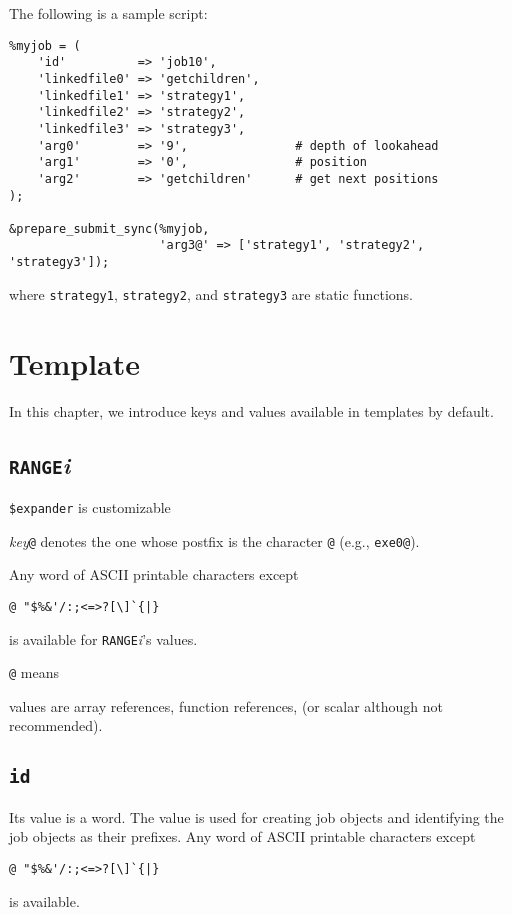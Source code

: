 \documentclass[a4paper,10pt]{report}
\begin{document}
The following is a sample script:
\begin{boxnote}
\begin{verbatim}
%myjob = (
    'id'          => 'job10',
    'linkedfile0' => 'getchildren',
    'linkedfile1' => 'strategy1',
    'linkedfile2' => 'strategy2',
    'linkedfile3' => 'strategy3',
    'arg0'        => '9',               # depth of lookahead
    'arg1'        => '0',               # position
    'arg2'        => 'getchildren'      # get next positions
);

&prepare_submit_sync(%myjob,
                     'arg3@' => ['strategy1', 'strategy2', 'strategy3']);
\end{verbatim}
\end{boxnote}
\noindent
where \texttt{strategy1}, \texttt{strategy2}, and
\texttt{strategy3} are static functions.

\chapter{Template}\label{chapjobdefhash}

In this chapter, we introduce keys and values available in templates
by default.

\section{\texttt{RANGE}\textit{i}}

\texttt{\$expander} is customizable

\textit{key}\texttt{@} denotes the one whose postfix is the
character \texttt{@} (e.g., \texttt{exe0@}).


Any word of ASCII printable characters except
\begin{center}
\verb*+@ "$%&'/:;<=>?[\]`{|}+        %
\end{center}
is available for \texttt{RANGE}\textit{i}'s values.

\texttt{@} means

values are array references, function references, (or scalar although
not recommended).

\section{\texttt{id}}

Its value is a word.  The value is used for creating job objects and
identifying the job objects as their prefixes.  Any word of ASCII
printable characters except
\begin{center}
\verb*+@ "$%&'/:;<=>?[\]`{|}+        %
\end{center}
is available.
\end{document}
